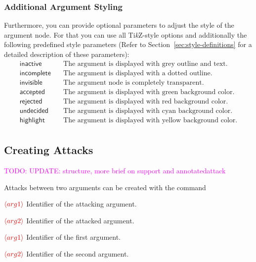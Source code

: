 \documentclass[headings=normal]{scrartcl}
\newcommand{\todo}[1]{\textcolor{magenta}{TODO: #1}} %
\newcommand{\tikzname}{Ti\emph{k}Z\xspace}
\newcommand{\opt}[2][red]{\ensuremath{\textcolor{#1}{\langle #2\rangle}}}
\newcommand{\makecmd}[1]{\textbackslash\hspace{-1ex}#1}
\newenvironment{command}[1]{
    \medskip\medskip
    \hspace{-1.5cm}{\ttfamily \makecmd{#1}}
    \begin{description}[labelindent=1.5cm,labelsep=0.5em, align=right]
}{%
    \end{description}
    \medskip
}
\begin{document}
\subsubsection{Additional Argument Styling}
    Furthermore, you can provide optional parameters to adjust the style of the argument node.
    For that you can use all \tikzname-style options and additionally the following predefined style parameters (Refer to Section~\ref{sec:style-definitions} for a detailed description of these parameters):
    \begin{align*}
        \mathsf{inactive} &\quad \text{The argument is displayed with grey outline and text.}\\
        \mathsf{incomplete} &\quad \text{The argument is displayed with a dotted outline.}\\
        \mathsf{invisible} &\quad \text{The argument node is completely transparent.}\\
        \mathsf{accepted} &\quad \text{The argument is displayed with green background color.}\\
        \mathsf{rejected} &\quad \text{The argument is displayed with red background color.}\\
        \mathsf{undecided} &\quad \text{The argument is displayed with cyan background color.}\\
        \mathsf{highlight} &\quad \text{The argument is displayed with yellow background color.}\\
    \end{align*}
    

\subsection{Creating Attacks}
    \todo{UPDATE: structure, more brief on support and annotatedattack}

    Attacks between two arguments can be created with the command

    \begin{command}{
        attack\{\opt{arg1}\}\{\opt{arg2}\}
    }
        \item[\opt{arg1}] Identifier of the attacking argument.
        \item[\opt{arg2}] Identifier of the attacked argument.
    \end{command}

    \begin{command}{
        dualattack\{\opt{arg1}\}\{\opt{arg2}\}
    }
        \item[\opt{arg1}] Identifier of the first argument.
        \item[\opt{arg2}] Identifier of the second argument.
    \end{command}
\end{document}

